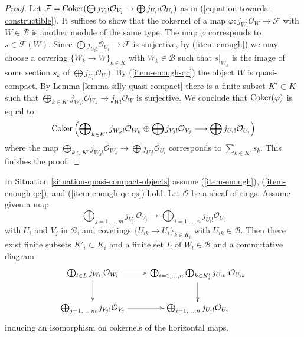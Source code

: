 \begin{proof}
Let $\mathcal{F} = \mathop{\mathrm{Coker}}(\bigoplus j_{V_j!}\mathcal{O}_{V_j} \to
\bigoplus j_{U_i!}\mathcal{O}_{U_i})$
as in (\ref{equation-towards-constructible}). It suffices to show
that the cokernel of a map $\varphi : j_{W!}\mathcal{O}_W \to \mathcal{F}$
with $W \in \mathcal{B}$ is another module of the same type.
The map $\varphi$ corresponds to $s \in \mathcal{F}(W)$.
Since $\bigoplus j_{U_i!}\mathcal{O}_{U_i} \to \mathcal{F}$ is
surjective, by (\ref{item-enough}) we may choose a covering
$\{W_k \to W\}_{k \in K}$ with $W_k \in \mathcal{B}$
such that $s|_{W_k}$ is the image of some section
$s_k$ of $\bigoplus j_{U_i!}\mathcal{O}_{U_i})$.
By (\ref{item-enough-qc}) the object $W$ is quasi-compact.
By Lemma \ref{lemma-silly-quasi-compact}
there is a finite subset $K' \subset K$ such that
$\bigoplus_{k \in K'} j_{W_k!}\mathcal{O}_{W_k} \to j_{W!}\mathcal{O}_W$
is surjective. We conclude that $\mathop{\mathrm{Coker}}(\varphi)$ is equal to
$$
\mathop{\mathrm{Coker}}\left(
\bigoplus\nolimits_{k \in K'} j_{W_k!}\mathcal{O}_{W_k} \oplus
\bigoplus j_{V_j!}\mathcal{O}_{V_j}
\longrightarrow
\bigoplus j_{U_i!}\mathcal{O}_{U_i}
\right)
$$
where the map $\bigoplus_{k \in K'} j_{W_k!}\mathcal{O}_{W_k}
\to \bigoplus j_{U_i!}\mathcal{O}_{U_i}$ corresponds to
$\sum_{k \in K'} s_k$. This finishes the proof.
\end{proof}

\begin{lemma}
\label{lemma-change-presentation-towards-constructibles}
In Situation \ref{situation-quasi-compact-objects} assume
(\ref{item-enough}), (\ref{item-enough-qc}), and (\ref{item-enough-qc-qs})
hold. Let $\mathcal{O}$ be a sheaf of rings. Assume given a map
$$
\bigoplus\nolimits_{j = 1, \ldots, m} j_{V_j!}\mathcal{O}_{V_j}
\longrightarrow
\bigoplus\nolimits_{i = 1, \ldots, n} j_{U_i!}\mathcal{O}_{U_i}
$$
with $U_i$ and $V_j$ in $\mathcal{B}$, and coverings
$\{U_{ik} \to U_i\}_{k \in K_i}$ with $U_{ik} \in \mathcal{B}$.
Then there exist finite subsets $K'_i \subset K_i$ and
a finite set $L$ of $W_l \in \mathcal{B}$ and a commutative diagram
$$
\xymatrix{
\bigoplus_{l \in L} j_{W_l!}\mathcal{O}_{W_l} \ar[d] \ar[r] &
\bigoplus_{i = 1, \ldots, n} \bigoplus_{k \in K'_i}
j_{U_{ik}!}\mathcal{O}_{U_{ik}} \ar[d] \\
\bigoplus_{j = 1, \ldots, m} j_{V_j!}\mathcal{O}_{V_j} \ar[r] &
\bigoplus_{i = 1, \ldots, n} j_{U_i!}\mathcal{O}_{U_i}
}
$$
inducing an isomorphism on cokernels of the horizontal maps.
\end{lemma}

